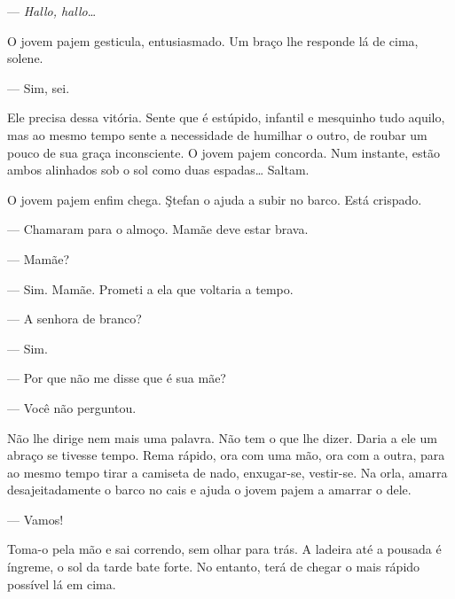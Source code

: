 --- \emph{Hallo, hallo}\ldots{}

O jovem pajem gesticula, entusiasmado. Um braço lhe responde lá de cima,
solene.


--- Sim, sei.


Ele precisa dessa vitória. Sente que é estúpido, infantil e mesquinho
tudo aquilo, mas ao mesmo tempo sente a necessidade de humilhar o outro,
de roubar um pouco de sua graça inconsciente. O jovem pajem concorda.
Num instante, estão ambos alinhados sob o sol como duas espadas\ldots{}
Saltam.


O jovem pajem enfim chega. Ştefan o ajuda a subir no barco. Está
crispado.

--- Chamaram para o almoço. Mamãe deve estar brava.

--- Mamãe?

--- Sim. Mamãe. Prometi a ela que voltaria a tempo.

--- A senhora de branco?

--- Sim.

--- Por que não me disse que é sua mãe?

--- Você não perguntou.

Não lhe dirige nem mais uma palavra. Não tem o que lhe dizer. Daria a ele
um abraço se tivesse tempo. Rema rápido, ora com uma mão, ora com a
outra, para ao mesmo tempo tirar a camiseta de nado, enxugar-se,
vestir-se. Na orla, amarra desajeitadamente o barco no cais e ajuda o
jovem pajem a amarrar o dele.

--- Vamos!

Toma-o pela mão e sai correndo, sem olhar para trás. A ladeira até a
pousada é íngreme, o sol da tarde bate forte. No entanto, terá de chegar
o mais rápido possível lá em cima.

